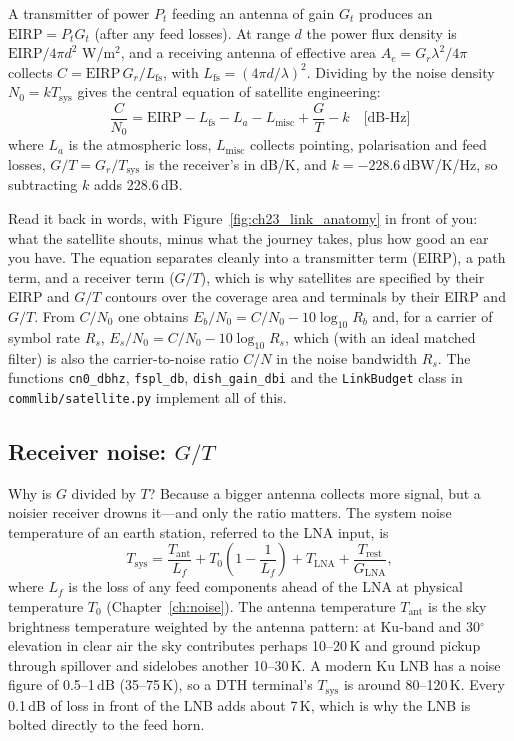 A transmitter of power $P_t$ feeding an antenna of gain $G_t$ produces an  $\text{EIRP}=P_tG_t$ (after any feed losses). At range $d$ the power
flux density is $\text{EIRP}/4\pi d^2$ W/m$^2$, and a receiving antenna of effective area
$A_e=G_r\lambda^2/4\pi$ collects $C=\text{EIRP}\,G_r/L_{\text{fs}}$, with
$L_{\text{fs}}=(4\pi d/\lambda)^2$. Dividing by the noise density $N_0=kT_{\text{sys}}$ gives the
central equation of satellite engineering:
\begin{equation}
\boxed{\;\frac{C}{N_0}=\text{EIRP}-L_{\text{fs}}-L_a-L_{\text{misc}}+\frac{G}{T}-k
\quad\text{[dB-Hz]}\;}
\label{eq:ch23:cn0}
\end{equation}
where $L_a$ is the atmospheric loss, $L_{\text{misc}}$ collects pointing, polarisation and
feed losses, $G/T=G_r/T_{\text{sys}}$ is the receiver's  in dB/K, and
$k=-228.6$\,dBW/K/Hz, so subtracting $k$ adds 228.6\,dB.

Read it back in words, with Figure~\ref{fig:ch23_link_anatomy} in front of you: what the satellite
shouts, minus what the journey takes, plus how good an ear you have. The equation separates cleanly into a transmitter term (EIRP), a path term, and a
receiver term ($G/T$), which is why satellites are specified by their EIRP and $G/T$ contours over
the coverage area and terminals by their EIRP and $G/T$. From $C/N_0$ one obtains
$E_b/N_0=C/N_0-10\log_{10}R_b$ and, for a carrier of symbol rate $R_s$,
$E_s/N_0=C/N_0-10\log_{10}R_s$, which (with an ideal matched filter) is also the carrier-to-noise
ratio $C/N$ in the noise bandwidth $R_s$. The functions \texttt{cn0\_dbhz}, \texttt{fspl\_db},
\texttt{dish\_gain\_dbi} and the \texttt{LinkBudget} class in \texttt{commlib/satellite.py}
implement all of this.

\subsection{Receiver noise: $G/T$}

Why is $G$ divided by $T$? Because a bigger antenna collects more signal, but a noisier receiver
drowns it---and only the ratio matters. The system noise temperature of an earth station, referred
to the LNA input, is
\begin{equation}
T_{\text{sys}}=\frac{T_{\text{ant}}}{L_f}+T_0\left(1-\frac{1}{L_f}\right)+T_{\text{LNA}}+\frac{T_{\text{rest}}}{G_{\text{LNA}}} ,
\label{eq:ch23:tsys}
\end{equation}
where $L_f$ is the loss of any feed components ahead of the LNA at physical temperature $T_0$
(Chapter~\ref{ch:noise}). The antenna temperature $T_{\text{ant}}$ is the sky brightness
temperature weighted by the antenna pattern: at Ku-band and 30$^\circ$ elevation in clear
air the sky contributes perhaps 10--20\,K and ground pickup through spillover and sidelobes
another 10--30\,K. A modern Ku LNB has a noise figure of 0.5--1\,dB (35--75\,K), so a DTH
terminal's $T_{\text{sys}}$ is around 80--120\,K. Every 0.1\,dB of loss in front of the LNB adds
about 7\,K, which is why the LNB is bolted directly to the feed horn.

